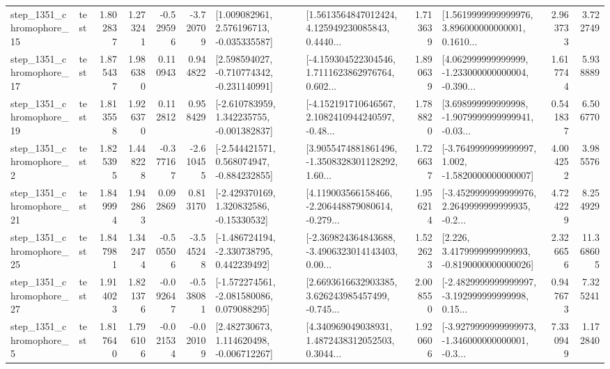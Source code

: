 \begin{tabular}{llrrrrllrlrr}
 step\_1351\_chromophore\_15 &      test &      1.802837 &    1.273241 &     -0.529596 & -3.720709 &    [1.009082961, 2.576196713, -0.035335587] &  [1.5613564847012424, 4.125949230085843, 0.4440... &       1.713639 &  [1.5619999999999976, 3.896000000000001, 0.1610... &            2.963733 &          3.722749 \\
 step\_1351\_chromophore\_17 &      test &      1.875437 &    1.986380 &      0.110943 &  0.944822 &   [2.598594027, -0.710774342, -0.231140991] &  [-4.159304522304546, 1.7111623862976764, 0.602... &       1.890639 &  [4.062999999999999, -1.233000000000004, -0.390... &            1.617744 &          5.938889 \\
 step\_1351\_chromophore\_19 &      test &      1.813558 &    1.926370 &      0.112812 &  0.958429 &   [-2.610783959, 1.342235755, -0.001382837] &  [-4.152191710646567, 2.1082410944240597, -0.48... &       1.788820 &  [3.698999999999998, -1.9079999999999941, -0.03... &            0.541837 &          6.506770 \\
  step\_1351\_chromophore\_2 &      test &      1.825395 &    1.448228 &     -0.377167 & -2.610455 &   [-2.544421571, 0.568074947, -0.884232855] &  [3.9055474881861496, -1.3508328301128292, 1.60... &       1.726637 &  [-3.7649999999999997, 1.002, -1.5820000000000007] &            4.004252 &          3.985576 \\
 step\_1351\_chromophore\_21 &      test &      1.849994 &    1.942863 &      0.092869 &  0.813170 &    [-2.429370169, 1.320832586, -0.15330532] &  [4.119003566158466, -2.206448879080614, -0.279... &       1.956214 &  [-3.4529999999999976, 2.2649999999999935, -0.2... &            4.724229 &          8.254929 \\
 step\_1351\_chromophore\_25 &      test &      1.847981 &    1.342474 &     -0.505506 & -3.545248 &   [-1.486724194, -2.330738795, 0.442239492] &  [-2.369824364843688, -3.4906323014143403, 0.00... &       1.522623 &   [2.226, 3.4179999999999993, -0.8190000000000026] &            2.326656 &         11.368605 \\
 step\_1351\_chromophore\_27 &      test &      1.914023 &    1.821376 &     -0.092647 & -0.538081 &   [-1.572274561, -2.081580086, 0.079088295] &  [2.6693616632903385, 3.626243985457499, -0.745... &       2.008550 &  [-2.4829999999999997, -3.192999999999998, 0.15... &            0.947673 &          7.325241 \\
  step\_1351\_chromophore\_5 &      test &      1.817640 &    1.796106 &     -0.021534 & -0.020109 &    [2.482730673, 1.114620498, -0.006712267] &  [4.340969049038931, 1.4872438312052503, 0.3044... &       1.920606 &  [-3.9279999999999973, -1.346000000000001, -0.3... &            7.330949 &          1.172840 \\

\end{tabular}
